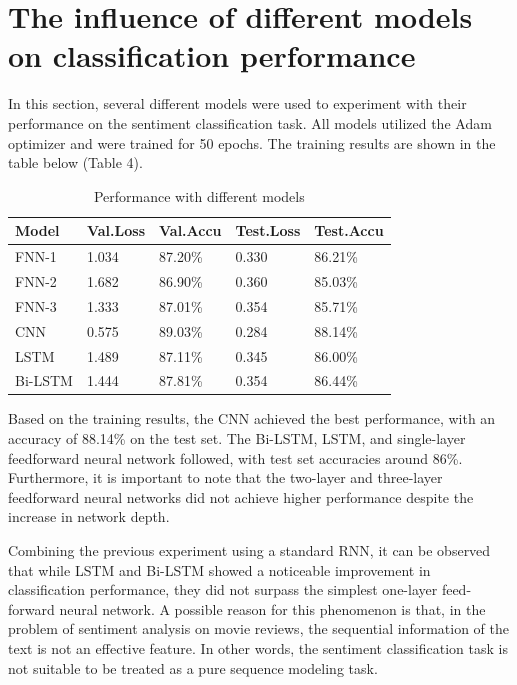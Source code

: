 \documentclass[letterpaper]{article} %
\begin{document}
\section{The influence of different models on classification performance}

In this section, several different models were used to experiment with their performance on the sentiment classification task. All models utilized the Adam optimizer and were trained for 50 epochs. The training results are shown in the table below (Table 4).

\begin{table}[H] %
	\centering %
	\caption{Performance with different models} 
	\label{tab:various model} 	
	\begin{tabularx}{\columnwidth}{l X X X X}
		\toprule 
		\textbf{Model} & \textbf{Val.Loss} & \textbf{Val.Accu} & \textbf{Test.Loss} & \textbf{Test.Accu} \\ 
		\midrule 
		FNN-1 & 1.034 & 87.20\% & 0.330 & 86.21\%\\
		FNN-2 & 1.682 & 86.90\% & 0.360 & 85.03\%\\
		FNN-3  & 1.333 & 87.01\% & 0.354 & 85.71\% \\
		CNN  & 0.575 & 89.03\% & 0.284 & 88.14\% \\
		LSTM & 1.489 & 87.11\% & 0.345 & 86.00\%\\
		Bi-LSTM & 1.444 & 87.81\% & 0.354 & 86.44\% \\
		\bottomrule 
	\end{tabularx}
\end{table}

Based on the training results, the CNN achieved the best performance, with an accuracy of 88.14\% on the test set. The Bi-LSTM, LSTM, and single-layer feedforward neural network followed, with test set accuracies around 86\%. Furthermore, it is important to note that the two-layer and three-layer feedforward neural networks did not achieve higher performance despite the increase in network depth.

Combining the previous experiment using a standard RNN, it can be observed that while LSTM and Bi-LSTM showed a noticeable improvement in classification performance, they did not surpass the simplest one-layer feed-forward neural network. A possible reason for this phenomenon is that, in the problem of sentiment analysis on movie reviews, the sequential information of the text is not an effective feature. In other words, the sentiment classification task is not suitable to be treated as a pure sequence modeling task.
\end{document}
